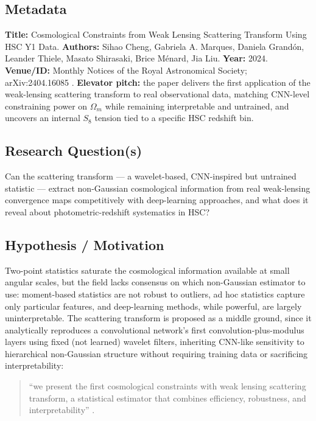 \documentclass[11pt]{article}
\begin{document}
\subsection{Metadata}
\textbf{Title:} Cosmological Constraints from Weak Lensing Scattering Transform Using HSC Y1 Data. \textbf{Authors:} Sihao Cheng, Gabriela A. Marques, Daniela Grandón, Leander Thiele, Masato Shirasaki, Brice Ménard, Jia Liu. \textbf{Year:} 2024. \textbf{Venue/ID:} Monthly Notices of the Royal Astronomical Society; arXiv:2404.16085 \citep{cheng2024scattering}. \textbf{Elevator pitch:} the paper delivers the first application of the weak-lensing scattering transform to real observational data, matching CNN-level constraining power on $\Omega_m$ while remaining interpretable and untrained, and uncovers an internal $S_8$ tension tied to a specific HSC redshift bin.

\subsection{Research Question(s)}
Can the scattering transform — a wavelet-based, CNN-inspired but untrained statistic — extract non-Gaussian cosmological information from real weak-lensing convergence maps competitively with deep-learning approaches, and what does it reveal about photometric-redshift systematics in HSC?

\subsection{Hypothesis / Motivation}
Two-point statistics saturate the cosmological information available at small angular scales, but the field lacks consensus on which non-Gaussian estimator to use: moment-based statistics are not robust to outliers, ad hoc statistics capture only particular features, and deep-learning methods, while powerful, are largely uninterpretable. The scattering transform is proposed as a middle ground, since it analytically reproduces a convolutional network's first convolution-plus-modulus layers using fixed (not learned) wavelet filters, inheriting CNN-like sensitivity to hierarchical non-Gaussian structure without requiring training data or sacrificing interpretability:

\begin{quote}
\enquote{we present the first cosmological constraints with weak lensing scattering transform, a statistical estimator that combines efficiency, robustness, and interpretability} \citep[p.~1]{cheng2024scattering}.
\end{quote}
\end{document}
